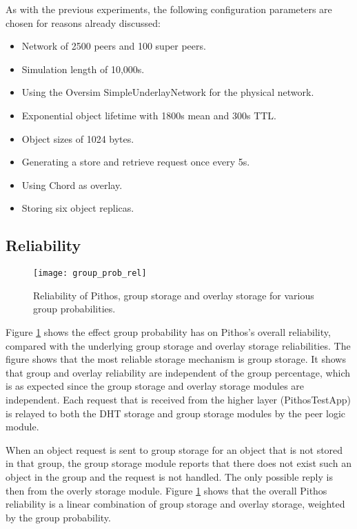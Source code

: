 As with the previous experiments, the following configuration parameters are chosen for reasons already discussed:
%
\begin{itemize}
\item Network of 2500 peers and 100 super peers.
\item Simulation length of 10,000s.
\item Using the Oversim SimpleUnderlayNetwork for the physical network.
\item Exponential object lifetime with 1800s mean and 300s TTL.
\item Object sizes of 1024 bytes.
\item Generating a store and retrieve request once every 5s.
\item Using Chord as overlay.
\item Storing six object replicas.
\end{itemize}

\subsection{Reliability}

\begin{figure}[htbp]
 \centering
 \texttt{[image: group\_prob\_rel]}
 \caption{Reliability of Pithos, group storage and overlay storage for various group probabilities.}
 \label{fig_group_prob_rel}
\end{figure}
%
Figure \ref{fig_group_prob_rel} shows the effect group probability has on Pithos's overall reliability, compared with the underlying group storage and overlay storage reliabilities. The figure shows that the most reliable storage mechanism is group storage. It shows that group and overlay reliability are independent of the group percentage, which is as expected since the group storage and overlay storage modules are independent. Each request that is received from the higher layer (PithosTestApp) is relayed to both the DHT storage and group storage modules by the peer logic module.

When an object request is sent to group storage for an object that is not stored in that group, the group storage module reports that there does not exist such an object in the group and the request is not handled. The only possible reply is then from the overly storage module. Figure \ref{fig_group_prob_rel} shows that the overall Pithos reliability is a linear combination of group storage and overlay storage, weighted by the group probability.

